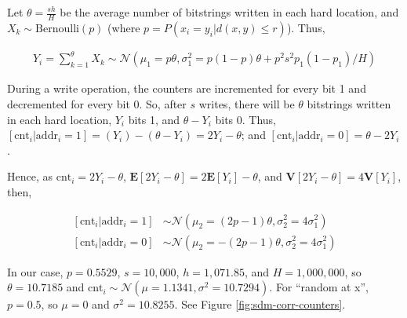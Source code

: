 \documentclass[12pt]{article}
\begin{document}
Let $\theta = \frac{sh}{H}$ be the average number of bitstrings written in each hard location, and $X_k \sim \text{Bernoulli}(p)$ (where $p = P(x_i = y_i | d(x, y) \le r)$). Thus,

\begin{align}
Y_i = \sum_{k=1}^{\theta} X_k \sim \mathcal{N}(\mu_1 = p \theta, \sigma_1^2 = p(1-p) \theta + p^2 s^2 p_1 (1 - p_1) / H)
\end{align}

During a write operation, the counters are incremented for every bit 1 and decremented for every bit 0. So, after $s$ writes, there will be $\theta$ bitstrings written in each hard location, $Y_i$ bits 1, and $\theta - Y_i$ bits 0. Thus, $[\text{cnt}_i | \text{addr}_i = 1] = (Y_i) - (\theta - Y_i) = 2Y_i - \theta$; and $[\text{cnt}_i | \text{addr}_i = 0] = \theta - 2Y_i$.

Hence, as $\text{cnt}_i = 2Y_i - \theta$, $\mathbf{E}[2Y_i - \theta] = 2 \mathbf{E}[Y_i] - \theta$, and $\mathbf{V}[2Y_i - \theta] = 4 \mathbf{V}[Y_i]$, then,

\begin{align}
\left[ \text{cnt}_i | \text{addr}_i=1 \right] &\sim \mathcal{N}(\mu_2 = (2p-1) \theta, \sigma_2^2 = 4 \sigma_1^2) \\
\left[ \text{cnt}_i | \text{addr}_i=0 \right] &\sim \mathcal{N}(\mu_2 = -(2p-1) \theta, \sigma_2^2 = 4 \sigma_1^2)
\end{align}

In our case, $p=0.5529$, $s=10,000$, $h=1,071.85$, and $H=1,000,000$, so $\theta = 10.7185$ and $\text{cnt}_i \sim \mathcal{N}(\mu=1.1341, \sigma^2 = 10.7294)$. For ``random at x'', $p=0.5$, so $\mu = 0$ and $\sigma^2 = 10.8255$. See Figure \ref{fig:sdm-corr-counters}.
\end{document}
